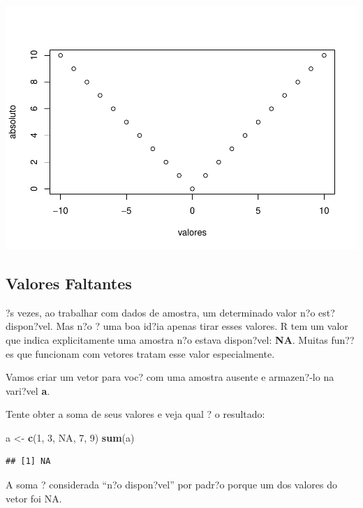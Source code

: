 \documentclass[]{book}
\newenvironment{Shaded}{\begin{snugshade}}{\end{snugshade}}
\newcommand{\DecValTok}[1]{\textcolor[rgb]{0.00,0.00,0.81}{#1}}
\newcommand{\KeywordTok}[1]{\textcolor[rgb]{0.13,0.29,0.53}{\textbf{#1}}}
\newcommand{\NormalTok}[1]{#1}
\newcommand{\OtherTok}[1]{\textcolor[rgb]{0.56,0.35,0.01}{#1}}
\newcommand{\StringTok}[1]{\textcolor[rgb]{0.31,0.60,0.02}{#1}}
\begin{document}
\includegraphics{TudodoR_files/figure-latex/unnamed-chunk-47-1.pdf}

\hypertarget{valores-faltantes}{%
\subsection{Valores Faltantes}\label{valores-faltantes}}

?s vezes, ao trabalhar com dados de amostra, um determinado valor n?o est? dispon?vel. Mas n?o ? uma boa id?ia apenas tirar esses valores. R tem um valor que indica explicitamente uma amostra n?o estava dispon?vel: \textbf{NA}. Muitas fun??es que funcionam com vetores tratam esse valor especialmente.

Vamos criar um vetor para voc? com uma amostra ausente e armazen?-lo na vari?vel \textbf{a}.

Tente obter a soma de seus valores e veja qual ? o resultado:

\begin{Shaded}
\begin{Highlighting}[]
\NormalTok{a <-}\StringTok{ }\KeywordTok{c}\NormalTok{(}\DecValTok{1}\NormalTok{, }\DecValTok{3}\NormalTok{, }\OtherTok{NA}\NormalTok{, }\DecValTok{7}\NormalTok{, }\DecValTok{9}\NormalTok{)}
\KeywordTok{sum}\NormalTok{(a)}
\end{Highlighting}
\end{Shaded}

\begin{verbatim}
## [1] NA
\end{verbatim}

A soma ? considerada ``n?o dispon?vel'' por padr?o porque um dos valores do vetor foi NA.
\end{document}
